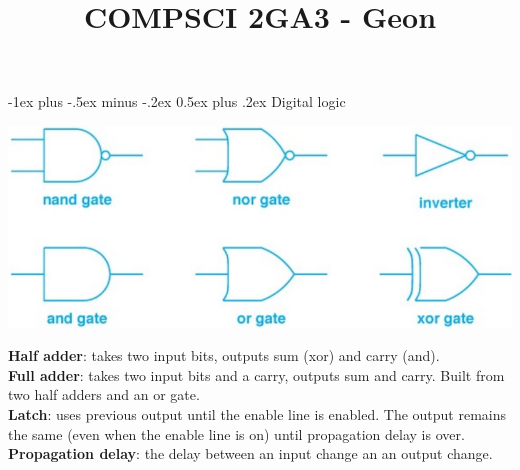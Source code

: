 \documentclass[10pt,landscape]{article}
\title{COMPSCI 2GA3 - Geon}
\makeatletter
\renewcommand{\section}{\@startsection{section}{1}{0mm}%
                                {-1ex plus -.5ex minus -.2ex}%
                                {0.5ex plus .2ex}%
                                {\normalfont\scriptsize\bfseries}}
\makeatother
\begin{document}
\raggedright
\footnotesize

\tiny\begin{multicols}{3}
\setlength{\premulticols}{1pt}
\setlength{\postmulticols}{1pt}
\setlength{\multicolsep}{3pt}
\setlength{\columnsep}{2pt}

\section{Digital logic}
{\centering\includegraphics[scale=0.23]{img/lg.png}\par} 
\textbf{Half adder}: takes two input bits, outputs sum (xor) and carry (and).\\
\textbf{Full adder}: takes two input bits and a carry, outputs sum and carry. Built from two half adders and an or gate.\\
\textbf{Latch}: uses previous output until the enable line is enabled. The output remains the same (even when the enable line is on) until propagation delay is over.\\
\textbf{Propagation delay}: the delay between an input change an an output change.\\

\end{multicols}
\end{document}
